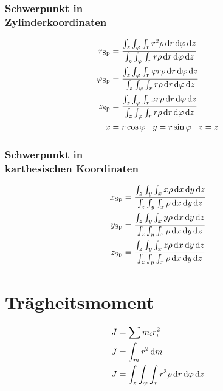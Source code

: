 \begin{multicols}{2}{}
\subsubsection*{Schwerpunkt in \\Zylinderkoordinaten}
\begin{align*}
r_{\text{Sp}}&=\frac{\int_z\int_\varphi\int_r r^2\rho \diff r \diff \varphi \diff z }{\int_z\int_\varphi\int_r r\rho \diff r \diff \varphi \diff z }\\
\varphi_{\text{Sp}}&=\frac{\int_z\int_\varphi\int_r \varphi r\rho \diff r \diff \varphi \diff z }{\int_z\int_\varphi\int_r r\rho \diff r \diff \varphi \diff z }\\
z_{\text{Sp}}&=\frac{\int_z\int_\varphi\int_r z r\rho \diff r \diff \varphi \diff z }{\int_z\int_\varphi\int_r r\rho \diff r \diff \varphi \diff z }\\
x&=r\cos{\varphi}\hspace{3mm}y=r\sin{\varphi}\hspace{3mm}z=z
\end{align*}

\subsubsection*{Schwerpunkt in \\karthesischen Koordinaten}
\begin{align*}
x_{\text{Sp}}&=\frac{\int_z\int_y\int_x x\rho \diff x \diff y \diff z }{\int_z\int_y\int_x \rho \diff x \diff y \diff z }\\
y_{\text{Sp}}&=\frac{\int_z\int_y\int_x y\rho \diff x \diff y \diff z }{\int_z\int_y\int_x \rho \diff x \diff y \diff z }\\
z_{\text{Sp}}&=\frac{\int_z\int_y\int_x z\rho \diff x \diff y \diff z }{\int_z\int_y\int_x \rho \diff x \diff y \diff z }
\end{align*}
\hfill
\end{multicols}


\newpage
\section{Trägheitsmoment}
\begin{align*}
J&=\sum m_i r_i^2\\
J&=\int_m r^2 \mathop{}\!\mathrm{d} m \\
J&=\int_z\int_\varphi\int_r r^3\rho \mathop{}\!\mathrm{d} r \mathop{}\!\mathrm{d} \varphi \mathop{}\!\mathrm{d} z 
\end{align*}

